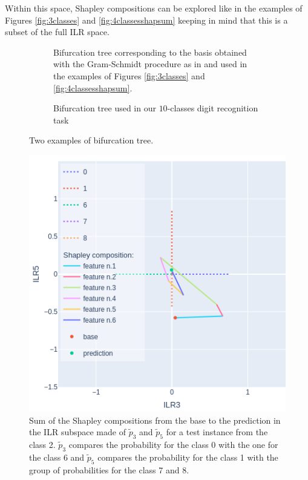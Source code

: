\documentclass{article}
\theoremstyle{plain}
\theoremstyle{definition}
\theoremstyle{remark}
\begin{document}
Within this space, Shapley compositions can be explored like in the examples of Figures \ref{fig:3classes} and \ref{fig:4classesshapsum} keeping in mind that this is a subset of the full ILR space. 
\begin{figure}
  \begin{subfigure}{0.5\textwidth}
    \centering
    
    \caption{Bifurcation tree corresponding to the basis obtained with the Gram-Schmidt procedure as in \cite{egozcue2003isometric} and used in the examples of Figures \ref{fig:3classes} and \ref{fig:4classesshapsum}.}
    \label{fig:bifurc1}
  \end{subfigure}

  \vspace{0.5cm}
  \begin{subfigure}{0.5\textwidth}
      \centering
      
      \caption{Bifurcation tree used in our $10$-classes digit recognition task}
      \label{fig:bifurc2}
    \end{subfigure}
  \caption{Two examples of bifurcation tree.}
  \label{fig:trees}
\end{figure}
\begin{figure}
  \centering
  \includegraphics[width=0.8\linewidth]{figures/moreclasses/ilrplot35.png}
  \caption{Sum of the Shapley compositions from the base to the prediction in the ILR subspace made of $\tilde{p}_3$ and $\tilde{p}_5$ for a test instance from the class 2. $\tilde{p}_3$ compares the probability for the class 0 with the one for the class 6 and $\tilde{p}_5$ compares the probability for the class 1 with the group of probabilities for the class 7 and 8. }
  \label{fig:moreclasses35}
\end{figure}
\end{document}

